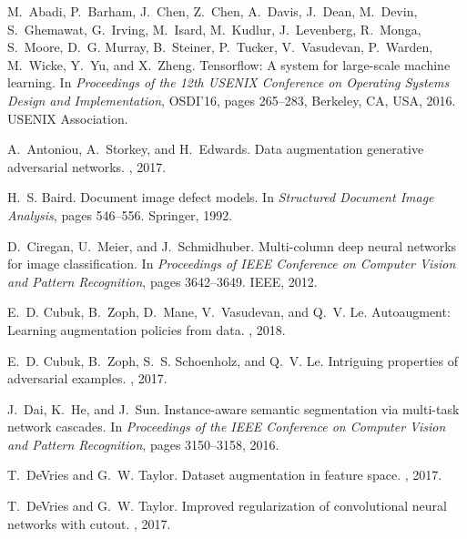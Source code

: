 \documentclass[10pt,twocolumn,letterpaper]{article}
\begin{document}
\begin{thebibliography}{10}\itemsep=-1pt

M.~Abadi, P.~Barham, J.~Chen, Z.~Chen, A.~Davis, J.~Dean, M.~Devin,
  S.~Ghemawat, G.~Irving, M.~Isard, M.~Kudlur, J.~Levenberg, R.~Monga,
  S.~Moore, D.~G. Murray, B.~Steiner, P.~Tucker, V.~Vasudevan, P.~Warden,
  M.~Wicke, Y.~Yu, and X.~Zheng.
\newblock Tensorflow: A system for large-scale machine learning.
\newblock In {\em Proceedings of the 12th USENIX Conference on Operating
  Systems Design and Implementation}, OSDI'16, pages 265--283, Berkeley, CA,
  USA, 2016. USENIX Association.

A.~Antoniou, A.~Storkey, and H.~Edwards.
\newblock Data augmentation generative adversarial networks.
, 2017.

H.~S. Baird.
\newblock Document image defect models.
\newblock In {\em Structured Document Image Analysis}, pages 546--556.
  Springer, 1992.

D.~Ciregan, U.~Meier, and J.~Schmidhuber.
\newblock Multi-column deep neural networks for image classification.
\newblock In {\em Proceedings of IEEE Conference on Computer Vision and Pattern
  Recognition}, pages 3642--3649. IEEE, 2012.

E.~D. Cubuk, B.~Zoph, D.~Mane, V.~Vasudevan, and Q.~V. Le.
\newblock Autoaugment: Learning augmentation policies from data.
, 2018.

E.~D. Cubuk, B.~Zoph, S.~S. Schoenholz, and Q.~V. Le.
\newblock Intriguing properties of adversarial examples.
, 2017.

J.~Dai, K.~He, and J.~Sun.
\newblock Instance-aware semantic segmentation via multi-task network cascades.
\newblock In {\em Proceedings of the IEEE Conference on Computer Vision and
  Pattern Recognition}, pages 3150--3158, 2016.

T.~DeVries and G.~W. Taylor.
\newblock Dataset augmentation in feature space.
, 2017.

T.~DeVries and G.~W. Taylor.
\newblock Improved regularization of convolutional neural networks with cutout.
, 2017.


\end{thebibliography}
\end{document}
